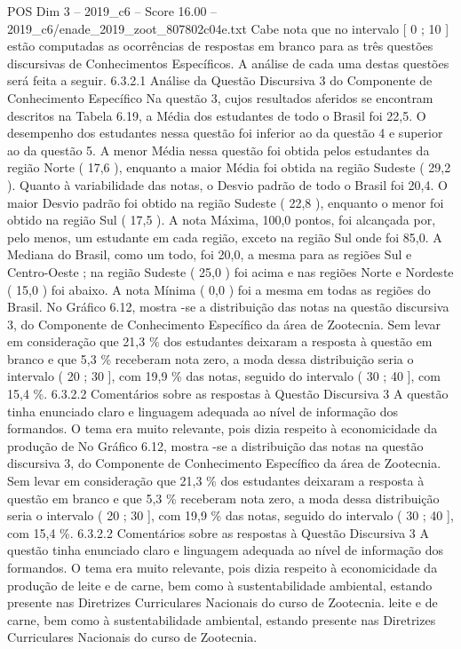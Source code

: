 \begin{textsample}{POS Dim 3 – 2019\_c6 – Score 16.00 – 2019\_c6/enade\_2019\_zoot\_807802c04e.txt}
Cabe nota que no intervalo [ 0 ; 10 ] estão computadas as ocorrências de respostas em branco para as três questões discursivas de Conhecimentos Específicos.
A análise de cada uma destas questões será feita a seguir. 6.3.2.1 Análise da Questão Discursiva 3 do Componente de Conhecimento Específico Na questão 3, cujos resultados aferidos se encontram descritos na Tabela 6.19, a Média dos estudantes de todo o Brasil foi 22,5.
O desempenho dos estudantes nessa questão foi inferior ao da questão 4 e superior ao da questão 5.
A menor Média nessa questão foi obtida pelos estudantes da região Norte ( 17,6 ), enquanto a maior Média foi obtida na região Sudeste ( 29,2 ).
Quanto à variabilidade das notas, o Desvio padrão de todo o Brasil foi 20,4.
O maior Desvio padrão foi obtido na região Sudeste ( 22,8 ), enquanto o menor foi obtido na região Sul ( 17,5 ).
A nota Máxima, 100,0 pontos, foi alcançada por, pelo menos, um estudante em cada região, exceto na região Sul onde foi 85,0.
A Mediana do Brasil, como um todo, foi 20,0, a mesma para as regiões Sul e Centro-Oeste ; na região Sudeste ( 25,0 ) foi acima e nas regiões Norte e Nordeste ( 15,0 ) foi abaixo.
A nota Mínima ( 0,0 ) foi a mesma em todas as regiões do Brasil.
No Gráfico 6.12, mostra -se a distribuição das notas na questão discursiva 3, do Componente de Conhecimento Específico da área de Zootecnia.
Sem levar em consideração que 21,3 \% dos estudantes deixaram a resposta à questão em branco e que 5,3 \% receberam nota zero, a moda dessa distribuição seria o intervalo ( 20 ; 30 ], com 19,9 \% das notas, seguido do intervalo ( 30 ; 40 ], com 15,4 \%. 6.3.2.2 Comentários sobre as respostas à Questão Discursiva 3 A questão tinha enunciado claro e linguagem adequada ao nível de informação dos formandos.
O tema era muito relevante, pois dizia respeito à economicidade da produção de No Gráfico 6.12, mostra -se a distribuição das notas na questão discursiva 3, do Componente de Conhecimento Específico da área de Zootecnia.
Sem levar em consideração que 21,3 \% dos estudantes deixaram a resposta à questão em branco e que 5,3 \% receberam nota zero, a moda dessa distribuição seria o intervalo ( 20 ; 30 ], com 19,9 \% das notas, seguido do intervalo ( 30 ; 40 ], com 15,4 \%. 6.3.2.2 Comentários sobre as respostas à Questão Discursiva 3 A questão tinha enunciado claro e linguagem adequada ao nível de informação dos formandos.
O tema era muito relevante, pois dizia respeito à economicidade da produção de leite e de carne, bem como à sustentabilidade ambiental, estando presente nas Diretrizes Curriculares Nacionais do curso de Zootecnia. leite e de carne, bem como à sustentabilidade ambiental, estando presente nas Diretrizes Curriculares Nacionais do curso de Zootecnia.

\end{textsample}
